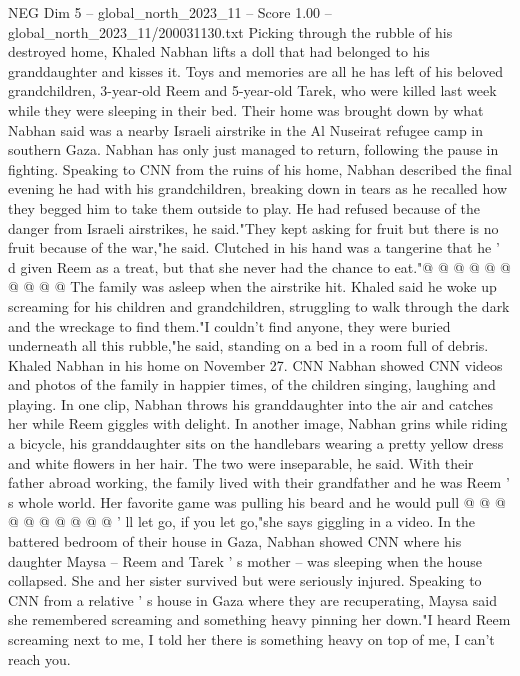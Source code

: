 \begin{textsample}{NEG Dim 5 – global\_north\_2023\_11 – Score 1.00 – global\_north\_2023\_11/200031130.txt}  \label{ex:f5_neg_033}
Picking through the rubble of his destroyed home, Khaled Nabhan lifts a doll that had belonged to his granddaughter and kisses it.
Toys and memories are all he has left of his beloved grandchildren, 3-year-old Reem and 5-year-old Tarek, who were killed last week while they were sleeping in their bed.
Their home was brought down by what Nabhan said was a nearby Israeli airstrike in the Al Nuseirat refugee camp in southern Gaza.
Nabhan has only just managed to return, following the pause in fighting.
Speaking to CNN from the ruins of his home, Nabhan described the final evening he had with his grandchildren, breaking down in tears as he recalled how they begged him to take them outside to play.
He had refused because of the danger from Israeli airstrikes, he said."They kept asking for fruit but there is no fruit because of the war,"he said.
Clutched in his hand was a tangerine that he ' d given Reem as a treat, but that she never had the chance to eat."@ @ @ @ @ @ @ @ @ @ The family was asleep when the airstrike hit.
Khaled said he woke up screaming for his children and grandchildren, struggling to walk through the dark and the wreckage to find them."I couldn't find anyone, they were buried underneath all this rubble,"he said, standing on a bed in a room full of debris.
Khaled Nabhan in his home on November 27.
CNN Nabhan showed CNN videos and photos of the family in happier times, of the children singing, laughing and playing.
In one clip, Nabhan throws his granddaughter into the air and catches her while Reem giggles with delight.
In another image, Nabhan grins while riding a bicycle, his granddaughter sits on the handlebars wearing a pretty yellow dress and white flowers in her hair.
The two were inseparable, he said.
With their father abroad working, the family lived with their grandfather and he was Reem ' s whole world.
Her favorite game was pulling his beard and he would pull @ @ @ @ @ @ @ @ @ @ ' ll let go, if you let go,"she says giggling in a video.
In the battered bedroom of their house in Gaza, Nabhan showed CNN where his daughter Maysa -- Reem and Tarek ' s mother -- was sleeping when the house collapsed.
She and her sister survived but were seriously injured.
Speaking to CNN from a relative ' s house in Gaza where they are recuperating, Maysa said she remembered screaming and something heavy pinning her down."I heard Reem screaming next to me, I told her there is something heavy on top of me, I can't reach you.

\end{textsample}
